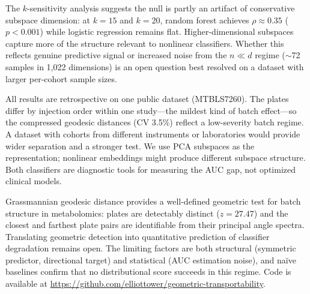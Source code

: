 \documentclass{article}
\begin{document}
The $k$-sensitivity analysis suggests the null is partly an artifact of conservative subspace dimension: at $k = 15$ and $k = 20$, random forest achieves $\rho \approx 0.35$ ($p < 0.001$) while logistic regression remains flat. Higher-dimensional subspaces capture more of the structure relevant to nonlinear classifiers. Whether this reflects genuine predictive signal or increased noise from the $n \ll d$ regime ($\sim$72 samples in 1{,}022 dimensions) is an open question best resolved on a dataset with larger per-cohort sample sizes.

All results are retrospective on one public dataset (MTBLS7260). The plates differ by injection order within one study---the mildest kind of batch effect---so the compressed geodesic distances (CV 3.5\%) reflect a low-severity batch regime. A dataset with cohorts from different instruments or laboratories would provide wider separation and a stronger test. We use PCA subspaces as the representation; nonlinear embeddings might produce different subspace structure. Both classifiers are diagnostic tools for measuring the AUC gap, not optimized clinical models.

Grassmannian geodesic distance provides a well-defined geometric test for batch structure in metabolomics: plates are detectably distinct ($z = 27.47$) and the closest and farthest plate pairs are identifiable from their principal angle spectra. Translating geometric detection into quantitative prediction of classifier degradation remains open. The limiting factors are both structural (symmetric predictor, directional target) and statistical (AUC estimation noise), and na\"{i}ve baselines confirm that no distributional score succeeds in this regime. Code is available at \url{https://github.com/elliottower/geometric-transportability}.



\end{document}
